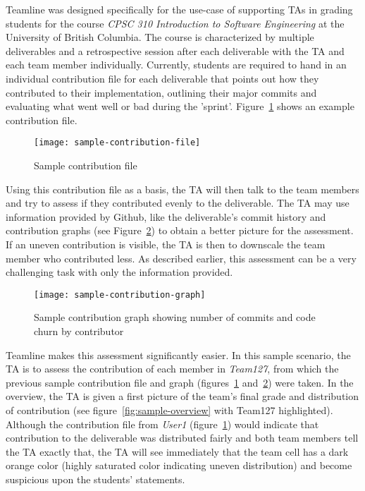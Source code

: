 \documentclass[../manifest.tex]{subfiles}
\begin{document}
Teamline was designed specifically for the use-case of supporting TAs in grading students for the course \textit{CPSC 310 Introduction to Software Engineering} at the University of British Columbia. The course is characterized by multiple deliverables and a retrospective session after each deliverable with the TA and each team member individually. Currently, students are required to hand in an individual contribution file for each deliverable that points out how they contributed to their implementation, outlining their major commits and evaluating what went well or bad during the 'sprint'. Figure~\ref{fig:sample-contribution-file} shows an example contribution file.

\begin{figure}[h]
  \centering
  \texttt{[image: sample-contribution-file]}
  \caption{Sample contribution file}
  \label{fig:sample-contribution-file}
\end{figure}

Using this contribution file as a basis, the TA will then talk to the team members and try to assess if they contributed evenly to the deliverable. The TA may use information provided by Github, like the deliverable's commit history and contribution graphs (see Figure~\ref{fig:sample-contribution-graph}) to obtain a better picture for the assessment. If an uneven contribution is visible, the TA is then to downscale the team member who contributed less. As described earlier, this assessment can be a very challenging task with only the information provided.

\begin{figure}[h]
  \centering
  \texttt{[image: sample-contribution-graph]}
  \caption{Sample contribution graph showing number of commits and code churn by contributor}
  \label{fig:sample-contribution-graph}
\end{figure}

Teamline makes this assessment significantly easier. In this sample scenario, the TA is to assess the contribution of each member in \textit{Team127}, from which the previous sample contribution file and graph (figures~\ref{fig:sample-contribution-file} and~\ref{fig:sample-contribution-graph}) were taken. In the overview, the TA is given a first picture of the team's final grade and distribution of contribution (see figure~\ref{fig:sample-overview} with Team127 highlighted). Although the contribution file from \textit{User1} (figure~\ref{fig:sample-contribution-file}) would indicate that contribution to the deliverable was distributed fairly and both team members tell the TA exactly that, the TA will see immediately that the team cell has a dark orange color (highly saturated color indicating uneven distribution) and become suspicious upon the students' statements.
\end{document}
